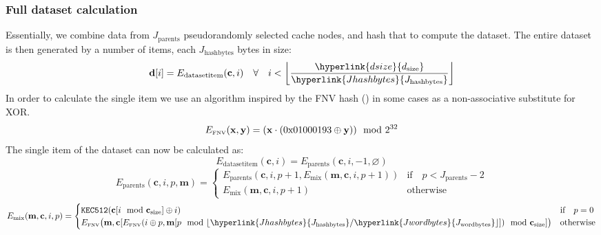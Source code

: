 \documentclass[9pt,oneside]{amsart}
\begin{document}
\subsubsection{Full dataset calculation} \label{dataset}
Essentially, we combine data from $J_{\mathrm{parents}}$ pseudorandomly selected cache nodes, and hash that to compute the dataset. The entire dataset is then generated by a number of items, each \hyperlink{Jhashbytes}{$J_{\mathrm{hashbytes}}$} bytes in size:
\begin{equation}
 \mathbf{d}[i] = E_{\mathrm{datasetitem}}(\mathbf{c}, i) \quad \forall \quad i < \left\lfloor\frac{\hyperlink{dsize}{d_{\mathrm{size}}}}{\hyperlink{Jhashbytes}{J_{\mathrm{hashbytes}}}}\right\rfloor
\end{equation}
In order to calculate the single item we use an algorithm inspired by the FNV hash (\cite{FowlerNollVo1991FNVHash}) in some cases as a non-associative substitute for XOR.
\begin{equation}
 E_\text{\tiny FNV}(\mathbf{x}, \mathbf{y}) = (\mathbf{x} \cdot (\mathrm{0x01000193} \oplus \mathbf{y})) \mod 2^{32}
\end{equation}
The single item of the dataset can now be calculated as:
\begin{equation}
 E_{\mathrm{datasetitem}}(\mathbf{c}, i) = E_{\mathrm{parents}}(\mathbf{c}, i, -1, \varnothing)
\end{equation}
\begin{equation}
  E_{\mathrm{parents}}(\mathbf{c}, i, p, \mathbf{m}) = \begin{cases}
E_{\mathrm{parents}}(\mathbf{c}, i, p +1, E_{\mathrm{mix}}(\mathbf{m}, \mathbf{c}, i, p + 1)) & \text{if} \quad p < J_{\mathrm{parents}} -2 \\
E_{\mathrm{mix}}(\mathbf{m}, \mathbf{c}, i, p + 1) & \text{otherwise}
\end{cases}
\end{equation}
\begin{equation}
 E_{\mathrm{mix}}(\mathbf{m}, \mathbf{c}, i, p) = \begin{cases}
\texttt{KEC512}(\mathbf{c}[i \mod \mathbf{c}_{\mathrm{size}}] \oplus i) & \text{if} \quad p = 0 \\
E_\text{\tiny FNV}\big(\mathbf{m}, \mathbf{c}[E_\text{\tiny FNV}(i \oplus p, \mathbf{m}[p \mod \lfloor \hyperlink{Jhashbytes}{J_{\mathrm{hashbytes}}} / \hyperlink{Jwordbytes}{J_{\mathrm{wordbytes}}} \rfloor]) \mod \mathbf{c}_{\mathrm{size}}] \big) & \text{otherwise}
\end{cases}
\end{equation}
\end{document}
